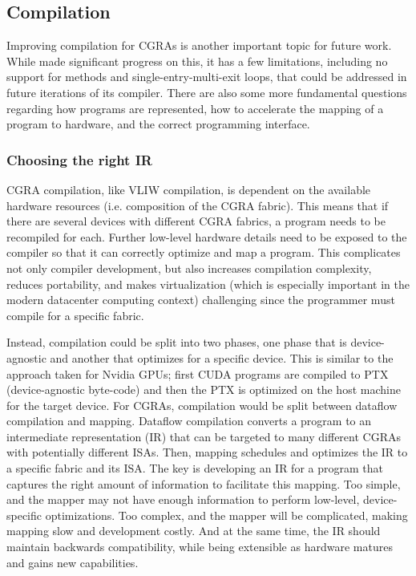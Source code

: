 \subsection{Compilation}
Improving compilation for CGRAs is another important topic for future work.
% 
While \riptide made significant progress on this, it has a few limitations, including no support for methods and single-entry-multi-exit loops, that could be addressed in future iterations of its compiler.
% 
There are also some more fundamental questions regarding how programs are represented, how to accelerate the mapping of a program to hardware, and the correct programming interface.

\subsubsection{Choosing the right IR}
CGRA compilation, like VLIW compilation, is dependent on the available hardware resources (i.e. composition of the CGRA fabric).
% 
% 
This means that if there are several devices with different CGRA fabrics, a program needs to be recompiled for each.
% 
Further low-level hardware details need to be exposed to the compiler so that it can correctly optimize and map a program.
% 
This complicates not only compiler development, but also increases compilation complexity, reduces portability, and makes virtualization (which is especially important in the modern datacenter computing context) challenging since the programmer must compile for a specific fabric.

Instead, compilation could be split into two phases, one phase that is device-agnostic and another that optimizes for a specific device.
% 
This is similar to the approach taken for Nvidia GPUs; first CUDA programs are compiled to PTX~\cite{ptx} (device-agnostic byte-code) and then the PTX is optimized on the host machine for the target device.
% 
For CGRAs, compilation would be split between dataflow compilation and mapping.
% 
Dataflow compilation converts a program to an intermediate representation (IR) that can be targeted to many different CGRAs with potentially different ISAs.
% 
Then, mapping schedules and optimizes the IR to a specific fabric and its ISA.
% 
The key is developing an IR for a program that captures the right amount of information to facilitate this mapping.
% 
Too simple, and the mapper may not have enough information to perform low-level, device-specific optimizations.
% 
Too complex, and the mapper will be complicated, making mapping slow and development costly.
%
And at the same time, the IR should maintain backwards compatibility, while being extensible as hardware matures and gains new capabilities.
% 


